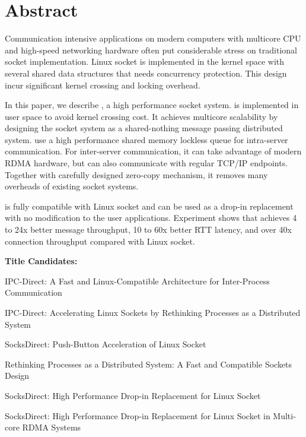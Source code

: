 \section*{Abstract}
Communication intensive applications on modern computers with multicore CPU and high-speed networking hardware 
often put considerable stress on traditional socket implementation. 
Linux socket is implemented in the kernel space with several shared data structures that needs concurrency protection. 
This design incur significant kernel crossing and locking overhead. 

In this paper, we describe \sys{}, a high performance socket system. 
\sys{} is implemented in user space to avoid kernel crossing cost. It achieves multicore scalability 
by designing the socket system as a shared-nothing message passing distributed system.
\sys{} use a high performance shared memory lockless queue for intra-server communication. For inter-server communication, 
it can take advantage of modern RDMA hardware, but can also communicate with regular TCP/IP endpoints.
Together with carefully designed zero-copy mechanism, it removes many overheads of existing socket systems. 

\sys{} is fully compatible with Linux socket and can be used as a drop-in replacement with no modification to the user applications. 
Experiment shows that \sys achieves 4 to 24x better message throughput, 10 to 60x better RTT latency, and over 40x connection 
throughput compared with Linux socket. 


\iffalse
\textbf{Title Candidates:}


IPC-Direct: A Fast and Linux-Compatible Architecture for Inter-Process Communication



IPC-Direct: Accelerating Linux Sockets by Rethinking Processes as a Distributed System

SocksDirect: Push-Button Acceleration of Linux Socket

Rethinking Processes as a Distributed System: A Fast and Compatible Sockets Design

SocksDirect: High Performance Drop-in Replacement for Linux Socket

SocksDirect: High Performance Drop-in Replacement for Linux Socket in Multi-core RDMA Systems

